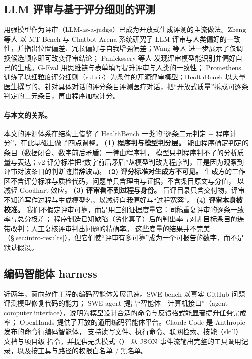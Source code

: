 \subsection{LLM 评审与基于评分细则的评测}
\label{sec:rel-judge}

用强模型作为评审（LLM-as-a-judge）已成为开放式生成评测的主流做法。Zheng 等人\cite{zheng2023judging} 以 MT-Bench 与 Chatbot Arena 系统研究了
LLM 评审与人类偏好的一致性，并指出位置偏差、冗长偏好与自我增强偏差；Wang 等人\cite{wang2024fair} 进一步展示了仅调换候选顺序即可改变评审结论；
Panickssery 等人\cite{panickssery2024self} 发现评审模型能识别并偏好自己的生成。G-Eval\cite{liu2023geval} 用思维链与表单填写提升评审与人类的一致性；
Prometheus\cite{kim2024prometheus} 训练了以细粒度评分细则（rubric）为条件的开源评审模型；HealthBench\cite{arora2025healthbench}
以大量医生撰写的、针对具体对话的评分条目评测医疗对话，把“开放式质量”拆成可逐条判定的二元条目，再由程序加权计分。

\paragraph{与本文的关系。}
本文的评测体系在结构上借鉴了 HealthBench 一类的“逐条二元判定 + 程序计分”，在此基础上做了四点调整。
\textbf{(1) 程序判与模型判分层。} 能由程序确定判定的条目（数据闭合、数字前后矛盾）一律由程序判，
模型只判程序判不了的分析质量与表达；v2 评分标准把“数字前后矛盾”从模型判改为程序判，正是因为观察到评审对该条目的判断随措辞波动。
\textbf{(2) 评分标准对生成方不可见。} 生成方的工作区不含评分标准与质检代码，问题单只含理由与证据，不含条目原文与分值，
以减轻 Goodhart 效应\cite{manheim2018goodhart}。
\textbf{(3) 评审看不到过程与身份。} 盲评目录只含交付物，评审不知道写作过程与生成模型名，以减轻自我偏好与“过程宽容”。
\textbf{(4) 评审本身被校准。} 我们不假定评审可靠，而是用三组证据度量它：同稿重复评审的逐条一致率与总分极差；
程序制造已知缺陷（劣化算子）后的判出率与对非目标条目的连带改判；人工复核评审判出问题的精确率。
这些度量的结果并不完美（\S\ref{sec:intro-results}），但它们使“评审有多可靠”成为一个可报告的数字，而不是默认假设。

\subsection{编码智能体 harness}
\label{sec:rel-harness}

近两年，面向软件工程的编码智能体发展迅速。SWE-bench\cite{jimenez2024swebench} 以真实 GitHub 问题评测模型修复代码的能力；
SWE-agent\cite{yang2024sweagent} 提出“智能体—计算机接口”（agent-computer interface），说明为模型设计合适的命令与反馈格式能显著提升任务完成率；
OpenHands\cite{wang2025openhands} 提供了开放的通用编码智能体平台。Claude Code\cite{anthropic2025claudecode} 是 Anthropic 发布的命令行编码智能体，
支持读写文件、执行命令、联网检索、技能（skill）文档与项目级  指令，并提供无头模式（）
以 JSON 事件流输出完整的工具调用记录，以及按工具与路径的权限白名单 / 黑名单。

